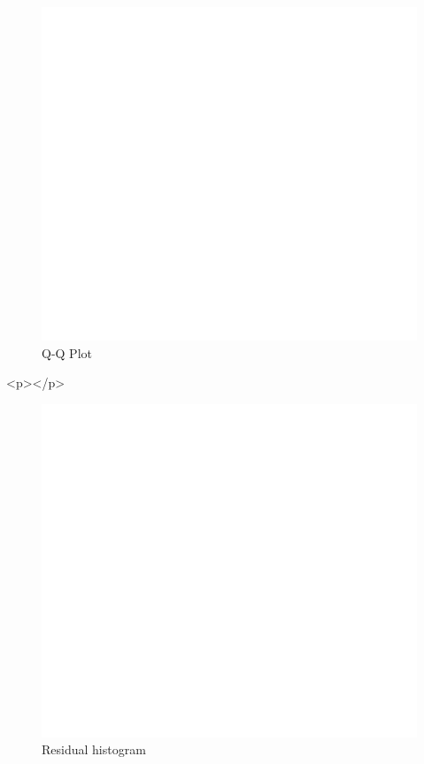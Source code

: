 \documentclass[a4paper,man,hidelinks,floatsintext]{apa7}
\begin{document}
    \begin{figure}[htbp]\caption{Q-Q Plot}
\label{fig:Figure_4}
\centering
\includegraphics[width=\columnwidth]{figure_4.pdf}
\end{figure}
      
        <p></p>
      
    \begin{figure}[htbp]\caption{Residual histogram}
\label{fig:Figure_5}
\centering
\includegraphics[width=\columnwidth]{figure_5.pdf}
\end{figure}
      
\end{document}
